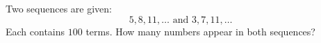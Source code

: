 Two sequences are given: \[5, 8, 11, \ldots\text{ and }3, 7, 11, \ldots\]Each contains $100$ terms. How many numbers appear in both sequences?
